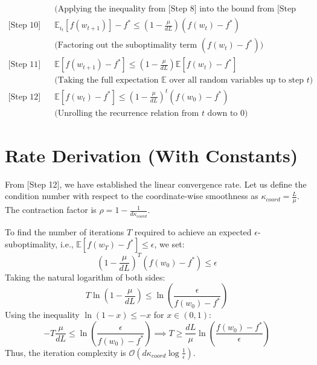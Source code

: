 \documentclass[11pt]{article}
\begin{document}
\begin{align}
    & \text{(Applying the inequality from [Step 8] into the bound from [Step 7])} \nonumber \\[10pt]
    \text{[Step 10]} \quad & \mathbb{E}_{i_t}[f(w_{t+1})] - f^* \leq \left( 1 - \frac{\mu}{dL} \right) (f(w_t) - f^*) \\
    & \text{(Factoring out the suboptimality term $(f(w_t) - f^*)$)} \nonumber \\[10pt]
    \text{[Step 11]} \quad & \mathbb{E}[f(w_{t+1}) - f^*] \leq \left( 1 - \frac{\mu}{dL} \right) \mathbb{E}[f(w_t) - f^*] \\
    & \text{(Taking the full expectation $\mathbb{E}$ over all random variables up to step $t$)} \nonumber \\[10pt]
    \text{[Step 12]} \quad & \mathbb{E}[f(w_t) - f^*] \leq \left( 1 - \frac{\mu}{dL} \right)^t (f(w_0) - f^*) \\
    & \text{(Unrolling the recurrence relation from $t$ down to $0$)} \nonumber
\end{align}

\section*{Rate Derivation (With Constants)}
From [Step 12], we have established the linear convergence rate. Let us define the condition number with respect to the coordinate-wise smoothness as $\kappa_{coord} = \frac{L}{\mu}$. 
The contraction factor is $\rho = 1 - \frac{1}{d \kappa_{coord}}$.

To find the number of iterations $T$ required to achieve an expected $\epsilon$-suboptimality, i.e., $\mathbb{E}[f(w_T) - f^*] \leq \epsilon$, we set:
\begin{equation}
    \left( 1 - \frac{\mu}{dL} \right)^T (f(w_0) - f^*) \leq \epsilon
\end{equation}
Taking the natural logarithm of both sides:
\begin{equation}
    T \ln\left( 1 - \frac{\mu}{dL} \right) \leq \ln\left( \frac{\epsilon}{f(w_0) - f^*} \right)
\end{equation}
Using the inequality $\ln(1-x) \leq -x$ for $x \in (0, 1)$:
\begin{equation}
    -T \frac{\mu}{dL} \leq \ln\left( \frac{\epsilon}{f(w_0) - f^*} \right) \implies T \geq \frac{dL}{\mu} \ln\left( \frac{f(w_0) - f^*}{\epsilon} \right)
\end{equation}
Thus, the iteration complexity is $\mathcal{O}\left( d \kappa_{coord} \log\frac{1}{\epsilon} \right)$.
\end{document}
